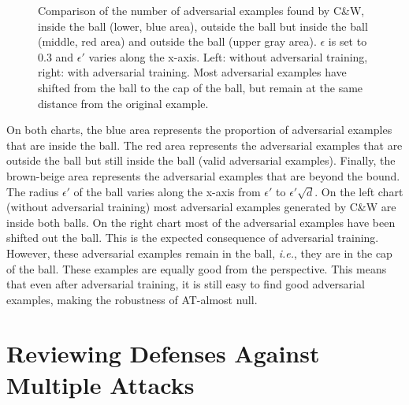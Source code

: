 \begin{figure}[htb]
    \centering
    
    \caption{Comparison of the number of adversarial examples found by C\&W, inside the \linf ball (lower, blue area), outside the \linf ball but inside the \ltwo ball (middle, red area) and outside the \ltwo ball (upper gray area). $\epsilon$ is set to $0.3$ and $\epsilon'$ varies along the x-axis. Left: without adversarial training, right: with adversarial training. Most adversarial examples have shifted from the \linf ball to the cap of the \ltwo ball, but remain at the same \ltwo distance from the original example.}
    \label{fig:calotte}
\end{figure}

On both charts, the blue area represents the proportion of adversarial examples that are inside the \linf ball. The red area represents the adversarial examples that are outside the \linf ball but still inside the \ltwo ball (valid \ltwo adversarial examples). Finally, the brown-beige area represents the adversarial examples that are beyond the \ltwo bound. The radius $\epsilon'$ of the \ltwo ball varies along the x-axis from $\epsilon'$ to $\epsilon' \sqrt{d}$. On the left chart (without adversarial training) most \ltwo adversarial examples generated by C\&W are inside both balls. On the right chart most of the adversarial examples have been shifted out the \linf ball. This is the expected consequence of \linf adversarial training. However, these adversarial examples remain in the \ltwo ball, \emph{i.e.}, they are in the cap of the \ltwo ball. These examples are equally good from the \ltwo perspective. This means that even after adversarial training, it is still easy to find good \ltwo adversarial examples, making the \ltwo robustness of AT-\linf almost null. 


\section{Reviewing Defenses Against Multiple Attacks}
\label{sec:building_defense_mechanisms}

